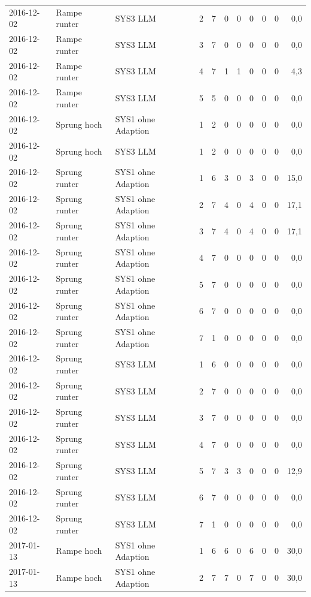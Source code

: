 \begin{tabular}{lllrrrrrrrr}
2016-12-02 & Rampe runter & SYS3 LLM & 2 & 7 & 0 & 0 & 0 & 0 & 0 & 0,0 \\
2016-12-02 & Rampe runter & SYS3 LLM & 3 & 7 & 0 & 0 & 0 & 0 & 0 & 0,0 \\
2016-12-02 & Rampe runter & SYS3 LLM & 4 & 7 & 1 & 1 & 0 & 0 & 0 & 4,3 \\
2016-12-02 & Rampe runter & SYS3 LLM & 5 & 5 & 0 & 0 & 0 & 0 & 0 & 0,0 \\
2016-12-02 & Sprung hoch & SYS1 ohne Adaption & 1 & 2 & 0 & 0 & 0 & 0 & 0 & 0,0 \\
2016-12-02 & Sprung hoch & SYS3 LLM & 1 & 2 & 0 & 0 & 0 & 0 & 0 & 0,0 \\
2016-12-02 & Sprung runter & SYS1 ohne Adaption & 1 & 6 & 3 & 0 & 3 & 0 & 0 & 15,0 \\
2016-12-02 & Sprung runter & SYS1 ohne Adaption & 2 & 7 & 4 & 0 & 4 & 0 & 0 & 17,1 \\
2016-12-02 & Sprung runter & SYS1 ohne Adaption & 3 & 7 & 4 & 0 & 4 & 0 & 0 & 17,1 \\
2016-12-02 & Sprung runter & SYS1 ohne Adaption & 4 & 7 & 0 & 0 & 0 & 0 & 0 & 0,0 \\
2016-12-02 & Sprung runter & SYS1 ohne Adaption & 5 & 7 & 0 & 0 & 0 & 0 & 0 & 0,0 \\
2016-12-02 & Sprung runter & SYS1 ohne Adaption & 6 & 7 & 0 & 0 & 0 & 0 & 0 & 0,0 \\
2016-12-02 & Sprung runter & SYS1 ohne Adaption & 7 & 1 & 0 & 0 & 0 & 0 & 0 & 0,0 \\
2016-12-02 & Sprung runter & SYS3 LLM & 1 & 6 & 0 & 0 & 0 & 0 & 0 & 0,0 \\
2016-12-02 & Sprung runter & SYS3 LLM & 2 & 7 & 0 & 0 & 0 & 0 & 0 & 0,0 \\
2016-12-02 & Sprung runter & SYS3 LLM & 3 & 7 & 0 & 0 & 0 & 0 & 0 & 0,0 \\
2016-12-02 & Sprung runter & SYS3 LLM & 4 & 7 & 0 & 0 & 0 & 0 & 0 & 0,0 \\
2016-12-02 & Sprung runter & SYS3 LLM & 5 & 7 & 3 & 3 & 0 & 0 & 0 & 12,9 \\
2016-12-02 & Sprung runter & SYS3 LLM & 6 & 7 & 0 & 0 & 0 & 0 & 0 & 0,0 \\
2016-12-02 & Sprung runter & SYS3 LLM & 7 & 1 & 0 & 0 & 0 & 0 & 0 & 0,0 \\
2017-01-13 & Rampe hoch & SYS1 ohne Adaption & 1 & 6 & 6 & 0 & 6 & 0 & 0 & 30,0 \\
2017-01-13 & Rampe hoch & SYS1 ohne Adaption & 2 & 7 & 7 & 0 & 7 & 0 & 0 & 30,0 \\

\end{tabular}
